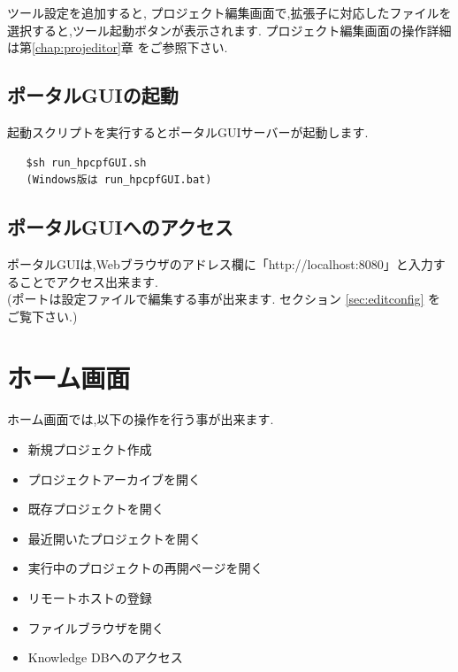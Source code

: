 \documentclass[a4paper,10pt,oneside]{jsbook}
\begin{document}
ツール設定を追加すると, プロジェクト編集画面で,拡張子に対応したファイルを選択すると,ツール起動ボタンが表示されます. プロジェクト編集画面の操作詳細は第\ref{chap:projeditor}章 をご参照下さい.

\newpage
\section{ポータルGUIの起動}
起動スクリプトを実行するとポータルGUIサーバーが起動します.
\begin{verbatim}
   $sh run_hpcpfGUI.sh
   (Windows版は run_hpcpfGUI.bat)
\end{verbatim}

\section{ポータルGUIへのアクセス}
ポータルGUIは,Webブラウザのアドレス欄に「http://localhost:8080」と入力することでアクセス出来ます.\\
(ポートは設定ファイルで編集する事が出来ます. セクション \ref{sec:editconfig} をご覧下さい.)

\chapter{ホーム画面}
ホーム画面では,以下の操作を行う事が出来ます.
\begin{itemize}
	\item 新規プロジェクト作成
	\item プロジェクトアーカイブを開く
	\item 既存プロジェクトを開く
	\item 最近開いたプロジェクトを開く
	\item 実行中のプロジェクトの再開ページを開く
	\item リモートホストの登録
	\item ファイルブラウザを開く
	\item Knowledge DBへのアクセス
\end{itemize}
\end{document}
